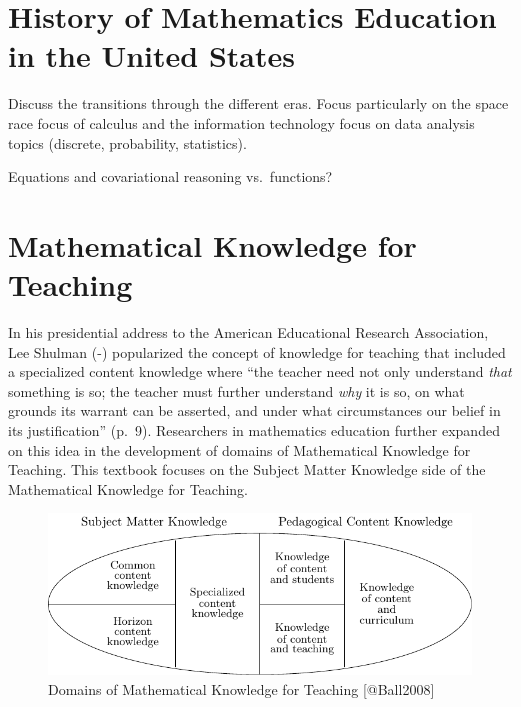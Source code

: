\documentclass[
]{book}
\let\stdsection\section
\renewcommand\section{\newpage\stdsection}
\theoremstyle{definition}
\theoremstyle{definition}
\theoremstyle{definition}
\theoremstyle{definition}
\theoremstyle{remark}
\begin{document}
\newpage

\hypertarget{MathEdHistory}{%
\section{History of Mathematics Education in the United States}\label{MathEdHistory}}

Discuss the transitions through the different eras. Focus particularly on the space race focus of calculus and the information technology focus on data analysis topics (discrete, probability, statistics).

Equations and covariational reasoning vs.~functions?

\hypertarget{MKT}{%
\section{Mathematical Knowledge for Teaching}\label{MKT}}

In his presidential address to the American Educational Research Association, Lee Shulman (-\citet{shulman1986}) popularized the concept of knowledge for teaching that included a specialized content knowledge where ``the teacher need not only understand \emph{that} something is so; the teacher must further understand \emph{why} it is so, on what grounds its warrant can be asserted, and under what circumstances our belief in its justification'' (p.~9). Researchers in mathematics education further expanded on this idea in the development of domains of Mathematical Knowledge for Teaching. This textbook focuses on the Subject Matter Knowledge side of the Mathematical Knowledge for Teaching.

\begin{figure}

{\centering \includegraphics[width=1\linewidth]{tikz/ballegg1} 

}

\caption{Domains of Mathematical Knowledge for Teaching [@Ball2008]}\label{fig:unnamed-chunk-3}
\end{figure}
\end{document}
